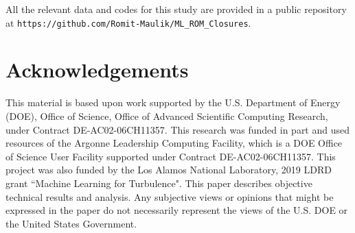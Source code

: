 \documentclass[preprint,12pt]{elsarticle}
\begin{document}
All the relevant data and codes for this study are provided in a public repository at \texttt{https://github.com/Romit-Maulik/ML\_ROM\_Closures}.

\section{Acknowledgements}

This material is based upon work supported by the U.S. Department of Energy (DOE), Office of Science, Office of Advanced Scientific Computing Research, under Contract DE-AC02-06CH11357. This research was funded in part and used resources of the Argonne Leadership Computing Facility, which is a DOE Office of Science User Facility supported under Contract DE-AC02-06CH11357. This project was also funded by the Los Alamos National Laboratory, 2019 LDRD grant ``Machine Learning for Turbulence". This paper describes objective technical results and analysis. Any subjective views or opinions that might be expressed in the paper do not necessarily represent the views of the U.S. DOE or the United States Government.













\end{document}
